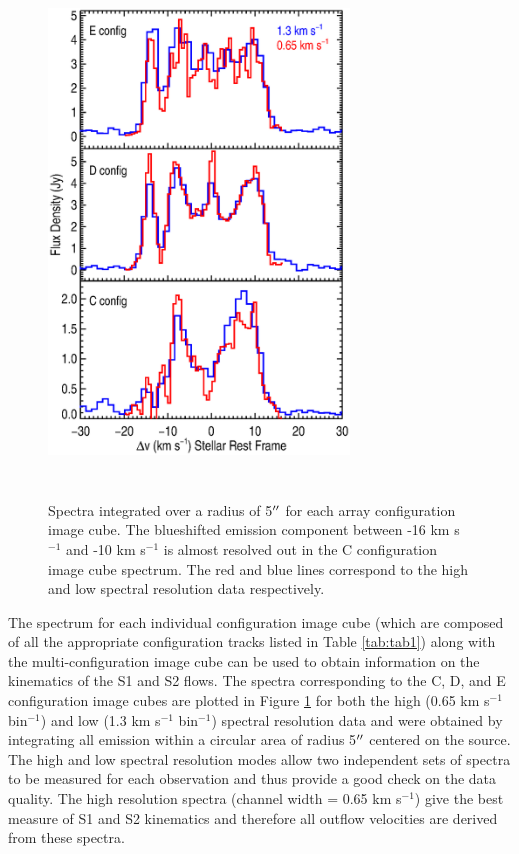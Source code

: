 \documentclass[iop]{emulateapj}
\begin{document}
\begin{figure}
\includegraphics[trim=90pt 60pt 45pt 50pt, clip, width=8.0cm, height=14.0cm]{f1.eps}
\caption{Spectra integrated over a radius of 5$\mbox{$^{\prime\prime}$}$ for each array configuration image cube. The blueshifted emission component between -16 km s${}^{-1}$ and -10 km s${}^{-1}$ is almost resolved out in the C configuration image cube spectrum. The red and blue lines correspond to the high and low spectral resolution data respectively.\label{fig1}}
\label{fig:fig1}
\end{figure}

The spectrum for each individual configuration image cube (which are composed of all the appropriate configuration tracks listed in Table \ref{tab:tab1}) along with the multi-configuration image cube can be used to obtain information on the kinematics of the S1 and S2 flows. The spectra corresponding  to the C, D, and E configuration image cubes are plotted in Figure \ref{fig:fig1} for both the high (0.65 km s${}^{-1}$ bin$^{-1}$) and low (1.3 km s${}^{-1}$ bin$^{-1}$) spectral resolution data and were obtained by integrating all emission within a circular area of radius 5$\mbox{$^{\prime\prime}$}$ centered on the source. The high and low spectral resolution modes allow two independent sets of spectra to be measured for each observation and thus provide a good check on the data quality. The high resolution  spectra (channel width = 0.65 km s${}^{-1}$) give the best measure of S1 and S2 kinematics and therefore all outflow velocities are derived from these spectra.
\end{document}
